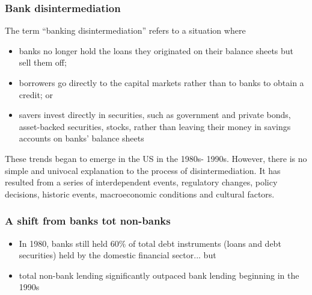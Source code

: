 \documentclass[11pt]{beamer}
\begin{document}
\begin{frame}
\frametitle{Bank disintermediation}
The term “banking disintermediation” refers to a situation
where
\begin{itemize}
\item banks no longer hold the loans they originated
on their balance sheets but sell them off;
\item borrowers go directly to the capital markets rather than to banks
to obtain a credit; or
\item savers invest directly in securities, such as government and private bonds, asset-backed securities, stocks, rather than leaving
their money in savings accounts on banks’ balance sheets
\end{itemize}

These trends began to emerge in the US in the 1980s-
1990s. However, there is no simple and univocal
explanation to the process of disintermediation. It has
resulted from a series of interdependent events,
regulatory changes, policy decisions, historic events,
macroeconomic conditions and cultural factors.
\end{frame}





\begin{frame}
\frametitle{A shift from banks tot non-banks}
\begin{itemize}
\item  In 1980, banks still held 60$\%$ of total debt instruments (loans and debt securities) held by the domestic financial sector... but
\item total non-bank lending significantly outpaced bank lending beginning in the 1990s



\end{itemize}
\end{frame}
\end{document}
